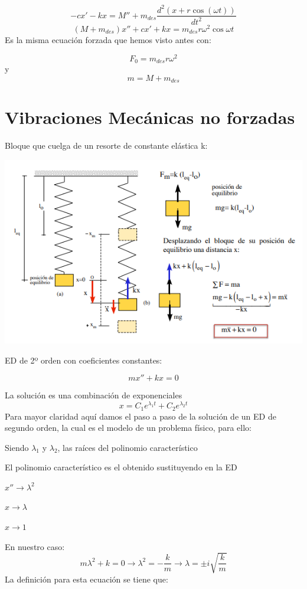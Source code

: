 \documentclass[oneside,12pt]{report}
\begin{document}
\begin{equation}
	-cx'-kx=M''+m_{des} \frac{d^{2}(x+r\cos (\omega t))}{dt^{2}}
\end{equation}
	\begin{equation}
			(M+m_{des})x''+cx'+kx=m_{des}r\omega ^{2} \cos\omega t
	\end{equation}
Es la misma ecuación forzada que hemos visto antes con:

$$F_0=m_{des}r\omega ^{2}$$
y
$$m=M+m_{des}$$
\section{Vibraciones Mecánicas no forzadas}
Bloque que cuelga de un resorte de constante elástica k:

\begin{center}
	\includegraphics[width=0.8\linewidth]{Captura}
\end{center}

ED de 2º orden con coeficientes constantes:

\begin{equation}
	mx''+kx=0
\end{equation}

La solución es una combinación de exponenciales
\begin{equation}
	x=C_1e^{\lambda_1 t}+C_2e^{\lambda_2 t}
\end{equation}
Para mayor claridad aquí damos el paso a paso de la solución de un ED de segundo orden, la cual es el modelo de un problema físico, para ello:

Siendo $\lambda_1$ y $\lambda_2$, las raíces del polinomio característico

El polinomio característico es el obtenido sustituyendo en la ED

\begin{center}
	$x''\longrightarrow \lambda^{2}$

$x\longrightarrow \lambda$

$x\longrightarrow 1$

\end{center}
En nuestro caso:
\begin{equation}
	m\lambda^{2}+k=0\longrightarrow\lambda^{2}=-\frac{k}{m}\longrightarrow\lambda=\pm i \sqrt{\frac{k}{m}}
\end{equation}
La definición para esta ecuación se tiene que:
 
\end{document}
